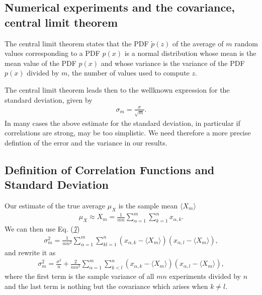 \documentclass[letterpaper,10pt,english]{sphinxmanual}
\begin{document}
\subsection{Numerical experiments and the covariance, central limit theorem}
\label{\detokenize{chapter2:numerical-experiments-and-the-covariance-central-limit-theorem}}
The central limit theorem states that the PDF \(\tilde{p}(z)\) of
the average of \(m\) random values corresponding to a PDF \(p(x)\)
is a normal distribution whose mean is the
mean value of the PDF \(p(x)\) and whose variance is the variance
of the PDF \(p(x)\) divided by \(m\), the number of values used to compute \(z\).

The central limit theorem leads then to the well\sphinxhyphen{}known expression for the
standard deviation, given by
\begin{equation*}
\begin{split}
\sigma_m=
\frac{\sigma}{\sqrt{m}}.
\end{split}
\end{equation*}
In many cases the above estimate for the standard deviation, in particular if correlations are strong, may be too simplistic.  We need therefore a more precise defintion of the error and the variance in our results.


\subsection{Definition of Correlation Functions and Standard Deviation}
\label{\detokenize{chapter2:definition-of-correlation-functions-and-standard-deviation}}
Our estimate of the true average \(\mu_{X}\) is the sample mean \(\langle X_m \rangle\)
\begin{equation*}
\begin{split}
\mu_{X}^{\phantom X} \approx X_m=\frac{1}{mn}\sum_{\alpha=1}^m\sum_{k=1}^n x_{\alpha,k}.
\end{split}
\end{equation*}
We can then use Eq. ({\hyperref[\detokenize{chapter2:eq:exptvariance}]{\emph{7}}})
\begin{equation*}
\begin{split}
\sigma^2_m=\frac{1}{mn^2}\sum_{\alpha=1}^m\sum_{kl=1}^n (x_{\alpha,k}-\langle X_m \rangle)(x_{\alpha,l}-\langle X_m \rangle),
\end{split}
\end{equation*}
and rewrite it as
\begin{equation*}
\begin{split}
\sigma^2_m=\frac{\sigma^2}{n}+\frac{2}{mn^2}\sum_{\alpha=1}^m\sum_{k<l}^n (x_{\alpha,k}-\langle X_m \rangle)(x_{\alpha,l}-\langle X_m \rangle),
\end{split}
\end{equation*}
where the first term is the sample variance of all \(mn\) experiments divided by \(n\)
and the last term is nothing but the covariance which arises when \(k\ne l\).
\end{document}

